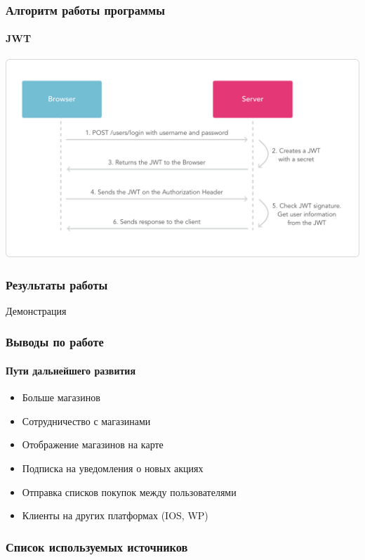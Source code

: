 \documentclass{beamer}
\begin{document}
\begin{frame}
    \frametitle{Алгоритм работы программы}
    \framesubtitle{JWT}
    \begin{center}
      \includegraphics[width=\linewidth]{jwt-diagram}
    \end{center} 
    \begin{flushright}
      {\tiny \cite{jwt}}
    \end{flushright}
\end{frame}

\begin{frame}[c]
    \frametitle{Результаты работы}
    \begin{center}
        Демонстрация
    \end{center}
\end{frame}

\begin{frame}
    \frametitle{Выводы по работе}
    \framesubtitle{Пути дальнейшего развития}
    \begin{itemize}
        \item Больше магазинов
        \item Сотрудничество с магазинами
        \item Отображение магазинов на карте
        \item Подписка на уведомления о новых акциях
        \item Отправка списков покупок между пользователями
        \item Клиенты на других платформах (IOS, WP)
    \end{itemize}
\end{frame}

\begin{frame}
    \frametitle{Список используемых источников}
    \nocite{*}
    \printbibliography{}
\end{frame}
\end{document}
